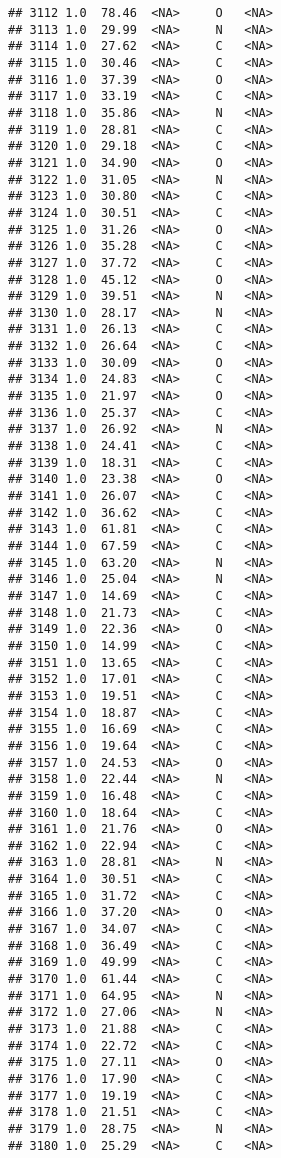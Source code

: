 \documentclass[
]{article}
\begin{document}
\begin{verbatim}
## 3112 1.0  78.46  <NA>     O   <NA>
## 3113 1.0  29.99  <NA>     N   <NA>
## 3114 1.0  27.62  <NA>     C   <NA>
## 3115 1.0  30.46  <NA>     C   <NA>
## 3116 1.0  37.39  <NA>     O   <NA>
## 3117 1.0  33.19  <NA>     C   <NA>
## 3118 1.0  35.86  <NA>     N   <NA>
## 3119 1.0  28.81  <NA>     C   <NA>
## 3120 1.0  29.18  <NA>     C   <NA>
## 3121 1.0  34.90  <NA>     O   <NA>
## 3122 1.0  31.05  <NA>     N   <NA>
## 3123 1.0  30.80  <NA>     C   <NA>
## 3124 1.0  30.51  <NA>     C   <NA>
## 3125 1.0  31.26  <NA>     O   <NA>
## 3126 1.0  35.28  <NA>     C   <NA>
## 3127 1.0  37.72  <NA>     C   <NA>
## 3128 1.0  45.12  <NA>     O   <NA>
## 3129 1.0  39.51  <NA>     N   <NA>
## 3130 1.0  28.17  <NA>     N   <NA>
## 3131 1.0  26.13  <NA>     C   <NA>
## 3132 1.0  26.64  <NA>     C   <NA>
## 3133 1.0  30.09  <NA>     O   <NA>
## 3134 1.0  24.83  <NA>     C   <NA>
## 3135 1.0  21.97  <NA>     O   <NA>
## 3136 1.0  25.37  <NA>     C   <NA>
## 3137 1.0  26.92  <NA>     N   <NA>
## 3138 1.0  24.41  <NA>     C   <NA>
## 3139 1.0  18.31  <NA>     C   <NA>
## 3140 1.0  23.38  <NA>     O   <NA>
## 3141 1.0  26.07  <NA>     C   <NA>
## 3142 1.0  36.62  <NA>     C   <NA>
## 3143 1.0  61.81  <NA>     C   <NA>
## 3144 1.0  67.59  <NA>     C   <NA>
## 3145 1.0  63.20  <NA>     N   <NA>
## 3146 1.0  25.04  <NA>     N   <NA>
## 3147 1.0  14.69  <NA>     C   <NA>
## 3148 1.0  21.73  <NA>     C   <NA>
## 3149 1.0  22.36  <NA>     O   <NA>
## 3150 1.0  14.99  <NA>     C   <NA>
## 3151 1.0  13.65  <NA>     C   <NA>
## 3152 1.0  17.01  <NA>     C   <NA>
## 3153 1.0  19.51  <NA>     C   <NA>
## 3154 1.0  18.87  <NA>     C   <NA>
## 3155 1.0  16.69  <NA>     C   <NA>
## 3156 1.0  19.64  <NA>     C   <NA>
## 3157 1.0  24.53  <NA>     O   <NA>
## 3158 1.0  22.44  <NA>     N   <NA>
## 3159 1.0  16.48  <NA>     C   <NA>
## 3160 1.0  18.64  <NA>     C   <NA>
## 3161 1.0  21.76  <NA>     O   <NA>
## 3162 1.0  22.94  <NA>     C   <NA>
## 3163 1.0  28.81  <NA>     N   <NA>
## 3164 1.0  30.51  <NA>     C   <NA>
## 3165 1.0  31.72  <NA>     C   <NA>
## 3166 1.0  37.20  <NA>     O   <NA>
## 3167 1.0  34.07  <NA>     C   <NA>
## 3168 1.0  36.49  <NA>     C   <NA>
## 3169 1.0  49.99  <NA>     C   <NA>
## 3170 1.0  61.44  <NA>     C   <NA>
## 3171 1.0  64.95  <NA>     N   <NA>
## 3172 1.0  27.06  <NA>     N   <NA>
## 3173 1.0  21.88  <NA>     C   <NA>
## 3174 1.0  22.72  <NA>     C   <NA>
## 3175 1.0  27.11  <NA>     O   <NA>
## 3176 1.0  17.90  <NA>     C   <NA>
## 3177 1.0  19.19  <NA>     C   <NA>
## 3178 1.0  21.51  <NA>     C   <NA>
## 3179 1.0  28.75  <NA>     N   <NA>
## 3180 1.0  25.29  <NA>     C   <NA>

\end{verbatim}
\end{document}
